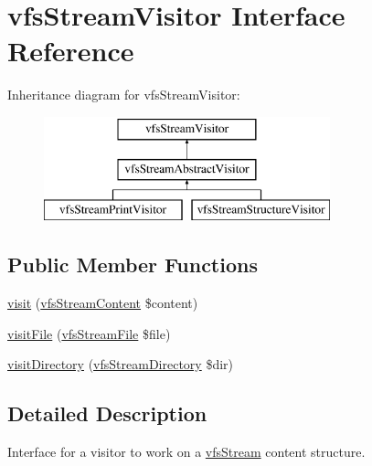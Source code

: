 \hypertarget{interfaceorg_1_1bovigo_1_1vfs_1_1visitor_1_1vfs_stream_visitor}{}\section{vfs\+Stream\+Visitor Interface Reference}
\label{interfaceorg_1_1bovigo_1_1vfs_1_1visitor_1_1vfs_stream_visitor}
Inheritance diagram for vfs\+Stream\+Visitor\+:\begin{figure}[H]
\begin{center}
\leavevmode
\includegraphics[height=3.000000cm]{interfaceorg_1_1bovigo_1_1vfs_1_1visitor_1_1vfs_stream_visitor}
\end{center}
\end{figure}
\subsection*{Public Member Functions}
\begin{DoxyCompactItemize}
\item 
\mbox{\hyperlink{interfaceorg_1_1bovigo_1_1vfs_1_1visitor_1_1vfs_stream_visitor_ad262024718e58f64d782ed2a392b0702}{visit}} (\mbox{\hyperlink{interfaceorg_1_1bovigo_1_1vfs_1_1vfs_stream_content}{vfs\+Stream\+Content}} \$content)
\item 
\mbox{\hyperlink{interfaceorg_1_1bovigo_1_1vfs_1_1visitor_1_1vfs_stream_visitor_aefbf1a8429cc874e03034c19eeba5a07}{visit\+File}} (\mbox{\hyperlink{classorg_1_1bovigo_1_1vfs_1_1vfs_stream_file}{vfs\+Stream\+File}} \$file)
\item 
\mbox{\hyperlink{interfaceorg_1_1bovigo_1_1vfs_1_1visitor_1_1vfs_stream_visitor_a58aba2b3abdff052e38254bba19aac72}{visit\+Directory}} (\mbox{\hyperlink{classorg_1_1bovigo_1_1vfs_1_1vfs_stream_directory}{vfs\+Stream\+Directory}} \$dir)
\end{DoxyCompactItemize}


\subsection{Detailed Description}
Interface for a visitor to work on a \mbox{\hyperlink{classorg_1_1bovigo_1_1vfs_1_1vfs_stream}{vfs\+Stream}} content structure.

